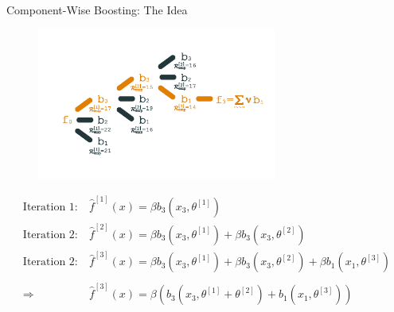 \begin{frame}[fragile]{Component-Wise Boosting: The Idea}

\begin{figure}
\centering
\includegraphics[width=0.7\textwidth]{images/comp_boosting.png}
\end{figure}

\vspace{-1.5cm}

\begin{align*}
  \text{Iteration 1:} \ &\hat{f}^{[1]}(x) = \beta b_3(x_3, \theta^{[1]}) \\
  \text{Iteration 2:} \ &\hat{f}^{[2]}(x) = \beta b_3(x_3, \theta^{[1]}) + \beta b_3(x_3, \theta^{[2]}) \\
  \text{Iteration 2:} \ &\hat{f}^{[3]}(x) = \beta b_3(x_3, \theta^{[1]}) + \beta b_3(x_3, \theta^{[2]}) + \beta b_1(x_1, \theta^{[3]}) \\ \\
  \Rightarrow\ &\hat{f}^{[3]}(x) = \beta \left( b_3(x_3, \theta^{[1]} + \theta^{[2]}) + b_1(x_1, \theta^{[3]}) \right)
\end{align*}


\end{frame}



